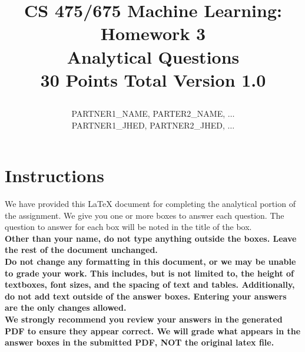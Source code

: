 \documentclass[11pt]{article}
\title{CS 475/675 Machine Learning: Homework 3\\
Analytical Questions\\
\Large{30 Points Total \hspace{1cm} Version 1.0}
\author{PARTNER1\_NAME, PARTER2\_NAME, $\ldots$ \\
PARTNER1\_JHED, PARTNER2\_JHED, $\ldots$}}
\date{}
\begin{document}
\maketitle
\thispagestyle{headings}


\section*{Instructions }
We have provided this \LaTeX{} document for completing the analytical portion of the assignment. We give you one or more boxes to answer each question.  The question to answer for each box will be noted in the title of the box.\\

{\bf Other than your name, do not type anything outside the boxes. Leave the rest of the document unchanged.}\\


\textbf{Do not change any formatting in this document, or we may be unable to
  grade your work. This includes, but is not limited to, the height of
  textboxes, font sizes, and the spacing of text and tables.  Additionally, do
  not add text outside of the answer boxes. Entering your answers are the only
  changes allowed.}\\


\textbf{We strongly recommend you review your answers in the generated PDF to
  ensure they appear correct. We will grade what appears in the answer boxes in
  the submitted PDF, NOT the original latex file.}

\pagebreak
\end{document}
